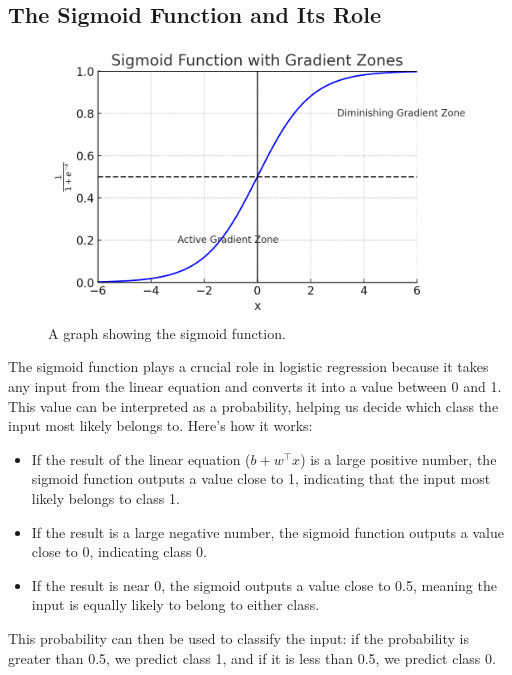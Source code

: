 \subsection{The Sigmoid Function and Its Role}
\begin{flushleft}
    \begin{figure}[H]
        \centering
        \includegraphics[width=0.45\linewidth]{ml/sigmoid_function.png}
        \caption{A graph showing the sigmoid function.}
        \label{fig:sigmoid_function}
    \end{figure}
    
    \large The sigmoid function plays a crucial role in logistic regression because it takes any input from the linear equation and converts it into a value between 0 and 1. This value can be interpreted as a probability, helping us decide which class the input most likely belongs to. Here's how it works:
    
    \begin{itemize}
        \item If the result of the linear equation (\( b + w^{\top}x \)) is a large positive number, the sigmoid function outputs a value close to 1, indicating that the input most likely belongs to class 1.
        \item If the result is a large negative number, the sigmoid function outputs a value close to 0, indicating class 0.
        \item If the result is near 0, the sigmoid outputs a value close to 0.5, meaning the input is equally likely to belong to either class.
    \end{itemize}
    
    This probability can then be used to classify the input: if the probability is greater than 0.5, we predict class 1, and if it is less than 0.5, we predict class 0.
\end{flushleft}

